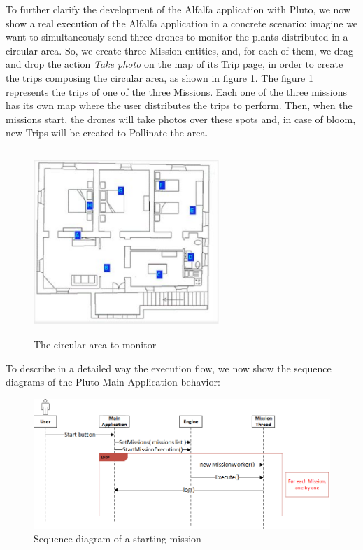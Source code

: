 To further clarify the development of the Alfalfa\cite{alfalfa} application with Pluto, we now show a real execution of the Alfalfa application in a concrete scenario:
imagine we want to simultaneously send three drones to monitor the plants distributed in a circular area.
So, we create three Mission entities, and, for each of them, we drag and drop the action \textit{Take photo} on the map of its Trip page, in order to create the trips composing the circular area, as shown in figure \ref{fig:alfalfaArea}.
The figure \ref{fig:alfalfaArea} represents the trips of one of the three Missions.
Each one of the three missions has its own map where the user distributes the trips to perform.
Then, when the missions start, the drones will take photos over these spots and, in case of bloom, new Trips will be created to Pollinate the area.
\\

\begin{figure}[h!]
  \centering
  \includegraphics[width=7cm,height=7cm]{pictures/alfalfaArea.png}
  \caption{The circular area to monitor}
  \label{fig:alfalfaArea}
\end{figure}


To describe in a detailed way the execution flow, we now show the sequence diagrams of the Pluto Main Application behavior:
\\

\begin{figure}[h!]
  \centering
  \includegraphics[width=\linewidth]{pictures/Alfalfa_Sequence_MissionStart.png}
  \caption{Sequence diagram of a starting mission}
  \label{fig:alfalfaSequence1}
\end{figure}

